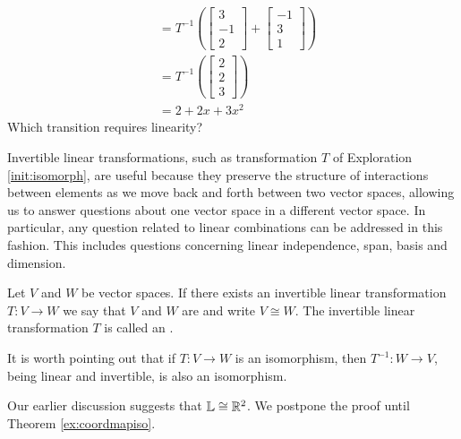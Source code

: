 \documentclass{ximera}
\begin{document}
\begin{exploration}
\begin{align}
      &=T^{-1}\left(\begin{bmatrix}3\\-1\\2\end{bmatrix}+\begin{bmatrix}-1\\3\\1\end{bmatrix}\right)\label{steplin3}\\
      &=T^{-1}\left(\begin{bmatrix}2\\2\\3\end{bmatrix}\right)\label{steplin4}\\
      &=2+2x+3x^2\label{steplin5}
  \end{align}
  Which transition requires linearity?
  \begin{multipleChoice}
    \end{multipleChoice}
\end{exploration}
Invertible linear transformations, such as transformation $T$ of Exploration \ref{init:isomorph}, are useful because they preserve the structure of interactions between elements as we move back and forth between two vector spaces, allowing us to answer questions about one vector space in a different vector space.  In particular, any question related to linear combinations can be addressed in this fashion. This includes questions concerning linear independence, span, basis and dimension. 

\begin{definition}\label{def:isomorphism} Let $V$ and $W$ be vector spaces.  If there exists an invertible linear transformation $T:V\rightarrow W$ we say that $V$ and $W$ are  and write $V\cong W$.  The invertible linear transformation $T$ is called an .
\end{definition}

It is worth pointing out that if $T:V\rightarrow W$ is an isomorphism, then $T^{-1}:W\rightarrow V$, being linear and invertible, is also an isomorphism.

\begin{example}\label{ex:lisor2}
Our earlier discussion suggests that $\mathbb{L}\cong\mathbb{R}^2$.  We postpone the proof until Theorem \ref{ex:coordmapiso}.
\end{example}
\end{document}
